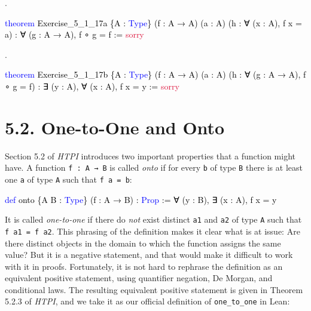 \documentclass[
  letterpaper,
  DIV=11,
  numbers=noendperiod]{scrreprt}
\newenvironment{Shaded}{\begin{snugshade}}{\end{snugshade}}
\newcommand{\ConstantTok}[1]{\textcolor[rgb]{0.56,0.35,0.01}{#1}}
\newcommand{\KeywordTok}[1]{\textcolor[rgb]{0.00,0.23,0.31}{#1}}
\newcommand{\NormalTok}[1]{\textcolor[rgb]{0.00,0.23,0.31}{#1}}
\renewcommand{\NormalTok}[1]{\textcolor[HTML]{000000}{#1}}
\renewcommand{\KeywordTok}[1]{\textcolor[HTML]{0000FF}{#1}}
\renewcommand{\ConstantTok}[1]{\textcolor[HTML]{DC143C}{#1}}
\newcommand{\nobreakShaded}{\renewenvironment{Shaded}
	{\begin{tcolorbox}[frame hidden, enhanced, interior hidden, boxrule=0pt,
		borderline west={3pt}{0pt}{shadecolor}, sharp corners]}
	{\end{tcolorbox}}}
\newenvironment{numex}[1]
	{\begin{minipage}[t]{0.04\textwidth}\vspace{8pt}{#1}.
		\end{minipage}\nobreakShaded\begin{minipage}[t]{0.96\textwidth}\vspace{0pt}}
	{\end{minipage}}
\theoremstyle{remark}
\begin{document}
\begin{numex}{7}

\begin{Shaded}
\begin{Highlighting}[]
\KeywordTok{theorem}\NormalTok{ Exercise\_5\_1\_17a \{A : }\KeywordTok{Type}\NormalTok{\} (f : A → A) (a : A)}
\NormalTok{    (h : ∀ (x : A), f x = a) : ∀ (g : A → A), f ∘ g = f := }\ConstantTok{sorry}
\end{Highlighting}
\end{Shaded}

\end{numex}

\begin{numex}{8}

\begin{Shaded}
\begin{Highlighting}[]
\KeywordTok{theorem}\NormalTok{ Exercise\_5\_1\_17b \{A : }\KeywordTok{Type}\NormalTok{\} (f : A → A) (a : A)}
\NormalTok{    (h : ∀ (g : A → A), f ∘ g = f) :}
\NormalTok{    ∃ (y : A), ∀ (x : A), f x = y := }\ConstantTok{sorry}
\end{Highlighting}
\end{Shaded}

\end{numex}

\hypertarget{one-to-one-and-onto}{%
\section{5.2. One-to-One and Onto}\label{one-to-one-and-onto}}

Section 5.2 of \emph{HTPI} introduces two important properties that a
function might have. A function \texttt{f\ :\ A\ →\ B} is called
\emph{onto} if for every \texttt{b} of type \texttt{B} there is at least
one \texttt{a} of type \texttt{A} such that \texttt{f\ a\ =\ b}:

\begin{Shaded}
\begin{Highlighting}[]
\KeywordTok{def}\NormalTok{ onto \{A B : }\KeywordTok{Type}\NormalTok{\} (f : A → B) : }\KeywordTok{Prop}\NormalTok{ :=}
\NormalTok{  ∀ (y : B), ∃ (x : A), f x = y}
\end{Highlighting}
\end{Shaded}

It is called \emph{one-to-one} if there do \emph{not} exist distinct
\texttt{a1} and \texttt{a2} of type \texttt{A} such that
\texttt{f\ a1\ =\ f\ a2}. This phrasing of the definition makes it clear
what is at issue: Are there distinct objects in the domain to which the
function assigns the same value? But it is a negative statement, and
that would make it difficult to work with it in proofs. Fortunately, it
is not hard to rephrase the definition as an equivalent positive
statement, using quantifier negation, De Morgan, and conditional laws.
The resulting equivalent positive statement is given in Theorem 5.2.3 of
\emph{HTPI}, and we take it as our official definition of
\texttt{one\_to\_one} in Lean:
\end{document}
